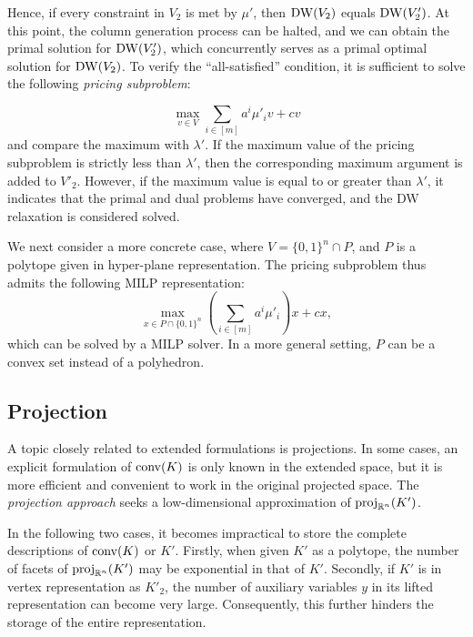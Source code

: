 Hence, if every constraint in $V_2$ is met by $\mu'$, then $\operatorname{DW}(V_2)$ equals $\operatorname{DW}(V'_2)$. At this point, the column generation process can be halted, and we can obtain the primal solution for $\operatorname{DW}(V'_2)$, which concurrently serves as a primal optimal solution for $\operatorname{DW}(V_2)$. To verify the  ``all-satisfied'' condition, it is sufficient to solve the following \emph{pricing subproblem}:

\begin{equation}
\label{eq.price}
    \max_{v \in V} \sum_{i \in [m]} a^i    \mu'_i v  + c v 
\end{equation}
and compare the maximum with $\lambda'$. If the maximum value of the pricing subproblem is strictly less than $\lambda'$, then the corresponding maximum argument is added to $V'_2$.  However, if the maximum value is equal to or greater than $\lambda'$,  it indicates that the primal and dual problems have converged, and the DW relaxation is considered solved.

We next consider a more concrete case, where $V = \{0,1\}^n \cap P$, and $P$ is a polytope given in hyper-plane representation. The pricing subproblem thus admits the following MILP representation:
\begin{equation}
\label{eq.priceref}
    \max_{x \in  P \cap \{0,1\}^n} (\sum_{i \in [m]} a^i    \mu'_i) x  + c x, 
\end{equation}
which can be solved by a MILP solver. In a more general setting, $P$ can be a convex set instead of a polyhedron.

\subsection{Projection}
A topic closely related to extended formulations is projections. In some cases, an explicit formulation of $\operatorname{conv}(K)$ is only known in the extended space, but it is more efficient and convenient to work in the original projected space.  The \emph{projection approach} seeks a low-dimensional approximation of $\operatorname{proj}_{\mathbb R^n}(K')$.

In the following two cases, it becomes impractical to store the complete descriptions of $\operatorname{conv}(K)$ or $K'$.
Firstly, when given  $K'$ as a polytope,  the number of facets of $\operatorname{proj}_{\mathbb R^n}(K')$ may be exponential in that of $K'$.  Secondly, if $K'$ is in vertex representation as $K'_2$, the number of auxiliary variables $y$ in its lifted representation can become very large. Consequently, this further hinders the storage of the entire representation.

